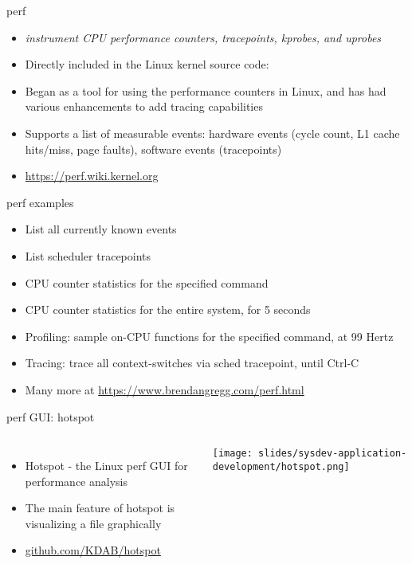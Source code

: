 \begin{frame}{perf}
  \begin{itemize}
  \item {\em instrument CPU performance counters, tracepoints, kprobes, and uprobes}
  \item Directly included in the Linux kernel source code: 
  \item Began as a tool for using the performance counters in Linux,
    and has had various enhancements to add tracing capabilities
  \item Supports a list of measurable events: hardware events (cycle
    count, L1 cache hits/miss, page faults), software events
    (tracepoints)
  \item \url{https://perf.wiki.kernel.org}
  \end{itemize}
\end{frame}

\begin{frame}{perf examples}
  \begin{itemize}
  \item List all currently known events\\
  \item List scheduler tracepoints\\
  \item CPU counter statistics for the specified command\\
  \item CPU counter statistics for the entire system, for 5 seconds\\
  \item Profiling: sample on-CPU functions for the specified command, at 99 Hertz\\
  \item Tracing: trace all context-switches via sched tracepoint, until Ctrl-C\\
  \item Many more at \url{https://www.brendangregg.com/perf.html}
  \end{itemize}
\end{frame}

\begin{frame}{perf GUI: hotspot}
  \begin{columns}[T]
    \begin{itemize}
    \item Hotspot - the Linux perf GUI for performance analysis
    \item The main feature of hotspot is visualizing a  file graphically
    \item \href{https://github.com/KDAB/hotspot}{github.com/KDAB/hotspot}
    \end{itemize}
    \texttt{[image: slides/sysdev-application-development/hotspot.png]}
  \end{columns}
\end{frame}

